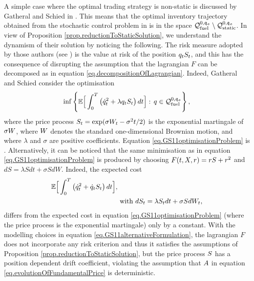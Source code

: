 \documentclass[10pt,a4paper]{article}
\begin{document}
	\begin{remark}\label{remark.GS11dynamicSolution}
		A simple case where the optimal trading strategy is non-static is discussed by Gatheral and Schied in \cite{GS11opt}. This means that the optimal inventory trajectory obtained from the stochastic control problem in \cite{GS11opt} is in the space $\spaceInventoryTrajectoriesFuel^{0,\initialInventory}\setminus \spaceInventoryTrajectoriesStatic^{0,\initialInventory}$.  In view of Proposition \ref{prop.reductionToStaticSolution}, we understand the dynamism of their solution by noticing the following. The risk measure adopted by those authors (see \cite[Section 2.1]{GS11opt}) is the value at risk of the position $\inventory_t \fundamentalPrice_t$, and this has the consequence of disrupting the assumption that the lagrangian $F$ can be decomposed as in equation \eqref{eq.decompositionOfLagrangian}. Indeed, Gatheral and Schied consider the optimisation 
		\begin{equation}\label{eq.GS11optimisationProblem}
		\inf\left\lbrace
		\Expectation \Big[
		\int_{0}^{\timeHorizon} \left(\inventoryRate_t\squared + \lambda \inventory_t\fundamentalPrice_t\right) dt
		\Big]
		 : \, \inventory \in \spaceInventoryTrajectoriesFuel^{0,\initialInventory}
		\right\rbrace,
		\end{equation}
		where the price process  $\fundamentalPrice_t = \exp(\sigma\brownianMotion_t -\sigma\squared t /2)$ is the exponential martingale of $\sigma\brownianMotion$, where $\brownianMotion$ denotes  the standard one-dimensional Brownian motion, and where $\lambda$ and $\sigma$ are positive coefficients. Equation \eqref{eq.GS11optimisationProblem} is  \cite[Equation (2.7)]{GS11opt}.
		Alternatively, it can be noticed that the same minimisation as in equation \eqref{eq.GS11optimisationProblem} is produced by choosing $F(t,X,r)=rS +  r\squared$ and $dS=\lambda Sdt +\sigma SdW$. Indeed, the expected cost 
		\begin{equation}\label{eq.GS11alternativeFormulation}
		\begin{split}
		\Expectation \Big[
		\int_{0}^{\timeHorizon} \left(\inventoryRate_t\squared +   \inventoryRate_t\fundamentalPrice_t\right) dt
		\Big],& \\
		& \text{ with } 
		d\fundamentalPrice_t = \lambda \fundamentalPrice_t dt + \sigma \fundamentalPrice d\brownianMotion_t,
		\end{split}
		\end{equation}
		differs from the expected cost in equation  \eqref{eq.GS11optimisationProblem} (where the price process is the exponential martingale) only by a constant. With the modelling choices in equation \eqref{eq.GS11alternativeFormulation}, the lagrangian $F$ does not incorporate any risk criterion and thus it satisfies the assumptions of Proposition \ref{prop.reductionToStaticSolution}, but the price process $\fundamentalPrice$ has a position dependent drift coefficient, violating  the assumption that $\boundedVariationPart$ in equation \eqref{eq.evolutionOfFundamentalPrice} is deterministic.
	\end{remark}
\end{document}
